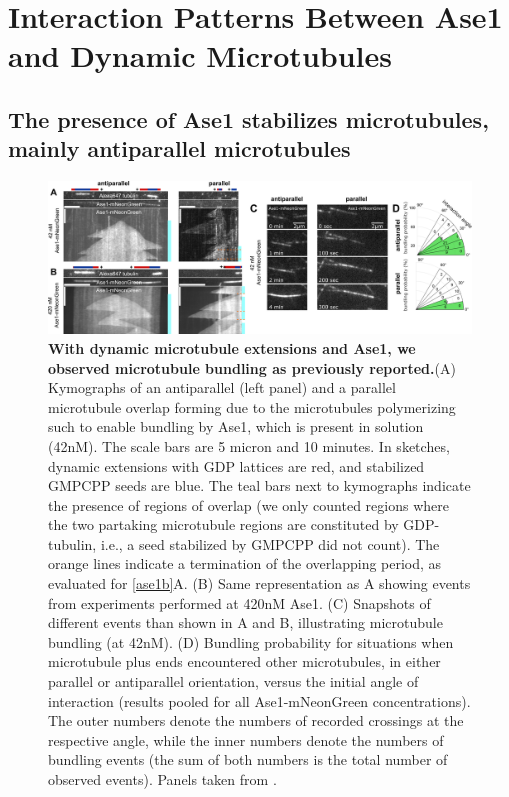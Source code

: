 \IntClearDoublePage
\section{Interaction Patterns Between Ase1 and Dynamic Microtubules}
\label{sec:Ase1}

\subsection{The presence of Ase1 stabilizes microtubules, mainly antiparallel microtubules}
\label{sec:ase11}
\begin{figure}[h]
    \centering
    \includegraphics[width=1\linewidth]{Figures/ase1_1a.png}
    \caption[With dynamic microtubule extensions and Ase1, we observed microtubule bundling as previously reported.]{
    \textbf{With dynamic microtubule extensions and Ase1, we observed microtubule bundling as previously reported.}(A) Kymographs of an antiparallel (left panel) and a parallel microtubule overlap forming due to the microtubules polymerizing such to enable bundling by Ase1, which is present in solution (42nM). The scale bars are 5 micron and 10 minutes. In sketches, dynamic extensions with GDP lattices are red, and stabilized GMPCPP seeds are blue. The teal bars next to kymographs indicate the presence of regions of overlap (we only counted regions where the two partaking microtubule regions are constituted by GDP-tubulin, i.e., a seed stabilized by GMPCPP did not count). The orange lines indicate a termination of the overlapping period, as evaluated for \autoref{ase1b}A. (B) Same representation as A showing events from experiments performed at 420nM Ase1. (C) Snapshots of different events than shown in A and B, illustrating microtubule bundling (at 42nM). (D) Bundling probability for situations when microtubule plus ends encountered other microtubules, in either parallel or antiparallel orientation, versus the initial angle of interaction (results pooled for all Ase1-mNeonGreen concentrations). The outer numbers denote the numbers of recorded crossings at the respective angle, while the inner numbers denote the numbers of bundling events (the sum of both numbers is the total number of observed events). Panels taken from \cite{Krattenmacher2024}.
        }\label{ase1a}
\end{figure}
